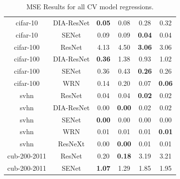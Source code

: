 \begin{table}[t]
\begin{center}
\begin{tabular}{|c|c|c|c|c|c|}
 cifar-10 & DIA-ResNet  & \textbf{0.05} &  0.08 & 0.28 & 0.32 \\
 cifar-10 & SENet  & 0.09 &  0.09 & \textbf{0.04} & 0.04 \\
\hline
 cifar-100 & ResNet  & 4.13 &  4.50 & \textbf{3.06} & 3.06 \\
 cifar-100 & DIA-ResNet  & \textbf{0.36} &  1.38 & 0.93 & 1.02 \\
 cifar-100 & SENet  & 0.36 &  0.43 & \textbf{0.26} & 0.26 \\
 cifar-100 & WRN  & 0.14 &  0.20 & 0.07 & \textbf{0.06} \\
\hline
 svhn & ResNet  & 0.04 &  0.04 & \textbf{0.02} & 0.02 \\
 svhn & DIA-ResNet  & 0.00 &  \textbf{0.00} & 0.02 & 0.02 \\
 svhn & SENet  & \textbf{0.00} &  0.00 & 0.00 & 0.00 \\
 svhn & WRN  & 0.01 &  0.01 & 0.01 & \textbf{0.01} \\
 svhn & ResNeXt  & 0.00 &  \textbf{0.00} & 0.01 & 0.01 \\
\hline
 cub-200-2011 & ResNet  & 0.20 &  \textbf{0.18} & 3.19 & 3.21 \\
 cub-200-2011 & SENet  & \textbf{1.07} &  1.29 & 1.85 & 1.95 \\
\hline
\end{tabular}
\end{center}
\caption{MSE Results for all CV model regressions. }
\label{table:MSEresults}
\end{table}






